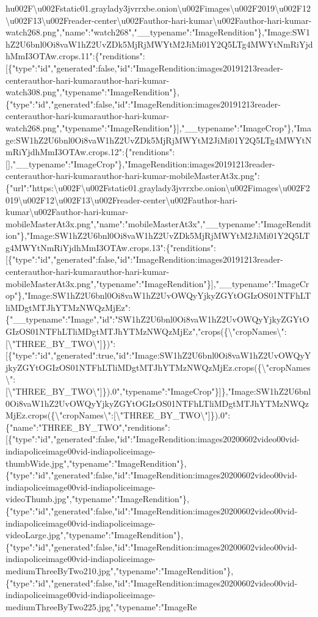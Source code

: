 h{}u002F\textbackslash{}u002Fstatic01.graylady3jvrrxbe.onion\textbackslash{}u002Fimages\textbackslash{}u002F2019\textbackslash{}u002F12\textbackslash{}u002F13\textbackslash{}u002Freader-center\textbackslash{}u002Fauthor-hari-kumar\textbackslash{}u002Fauthor-hari-kumar-watch268.png","name":"watch268","\_\_typename":"ImageRendition"\},"Image:SW1hZ2U6bnl0Oi8vaW1hZ2UvZDk5MjRjMWYtM2JiMi01Y2Q5LTg4MWYtNmRiYjdhMmI3OTAw.crops.11":\{"renditions":{[}\{"type":"id","generated":false,"id":"ImageRendition:images20191213reader-centerauthor-hari-kumarauthor-hari-kumar-watch308.png","typename":"ImageRendition"\},\{"type":"id","generated":false,"id":"ImageRendition:images20191213reader-centerauthor-hari-kumarauthor-hari-kumar-watch268.png","typename":"ImageRendition"\}{]},"\_\_typename":"ImageCrop"\},"Image:SW1hZ2U6bnl0Oi8vaW1hZ2UvZDk5MjRjMWYtM2JiMi01Y2Q5LTg4MWYtNmRiYjdhMmI3OTAw.crops.12":\{"renditions":{[}{]},"\_\_typename":"ImageCrop"\},"ImageRendition:images20191213reader-centerauthor-hari-kumarauthor-hari-kumar-mobileMasterAt3x.png":\{"url":"https:\textbackslash{}u002F\textbackslash{}u002Fstatic01.graylady3jvrrxbe.onion\textbackslash{}u002Fimages\textbackslash{}u002F2019\textbackslash{}u002F12\textbackslash{}u002F13\textbackslash{}u002Freader-center\textbackslash{}u002Fauthor-hari-kumar\textbackslash{}u002Fauthor-hari-kumar-mobileMasterAt3x.png","name":"mobileMasterAt3x","\_\_typename":"ImageRendition"\},"Image:SW1hZ2U6bnl0Oi8vaW1hZ2UvZDk5MjRjMWYtM2JiMi01Y2Q5LTg4MWYtNmRiYjdhMmI3OTAw.crops.13":\{"renditions":{[}\{"type":"id","generated":false,"id":"ImageRendition:images20191213reader-centerauthor-hari-kumarauthor-hari-kumar-mobileMasterAt3x.png","typename":"ImageRendition"\}{]},"\_\_typename":"ImageCrop"\},"Image:SW1hZ2U6bnl0Oi8vaW1hZ2UvOWQyYjkyZGYtOGIzOS01NTFhLTliMDgtMTJhYTMzNWQzMjEz":\{"\_\_typename":"Image","id":"SW1hZ2U6bnl0Oi8vaW1hZ2UvOWQyYjkyZGYtOGIzOS01NTFhLTliMDgtMTJhYTMzNWQzMjEz","crops(\{\textbackslash{}"cropNames\textbackslash{}":{[}\textbackslash{}"THREE\_BY\_TWO\textbackslash{}"{]}\})":{[}\{"type":"id","generated":true,"id":"Image:SW1hZ2U6bnl0Oi8vaW1hZ2UvOWQyYjkyZGYtOGIzOS01NTFhLTliMDgtMTJhYTMzNWQzMjEz.crops(\{\textbackslash{}"cropNames\textbackslash{}":{[}\textbackslash{}"THREE\_BY\_TWO\textbackslash{}"{]}\}).0","typename":"ImageCrop"\}{]}\},"Image:SW1hZ2U6bnl0Oi8vaW1hZ2UvOWQyYjkyZGYtOGIzOS01NTFhLTliMDgtMTJhYTMzNWQzMjEz.crops(\{\textbackslash{}"cropNames\textbackslash{}":{[}\textbackslash{}"THREE\_BY\_TWO\textbackslash{}"{]}\}).0":\{"name":"THREE\_BY\_TWO","renditions":{[}\{"type":"id","generated":false,"id":"ImageRendition:images20200602video00vid-indiapoliceimage00vid-indiapoliceimage-thumbWide.jpg","typename":"ImageRendition"\},\{"type":"id","generated":false,"id":"ImageRendition:images20200602video00vid-indiapoliceimage00vid-indiapoliceimage-videoThumb.jpg","typename":"ImageRendition"\},\{"type":"id","generated":false,"id":"ImageRendition:images20200602video00vid-indiapoliceimage00vid-indiapoliceimage-videoLarge.jpg","typename":"ImageRendition"\},\{"type":"id","generated":false,"id":"ImageRendition:images20200602video00vid-indiapoliceimage00vid-indiapoliceimage-mediumThreeByTwo210.jpg","typename":"ImageRendition"\},\{"type":"id","generated":false,"id":"ImageRendition:images20200602video00vid-indiapoliceimage00vid-indiapoliceimage-mediumThreeByTwo225.jpg","typename":"ImageRe